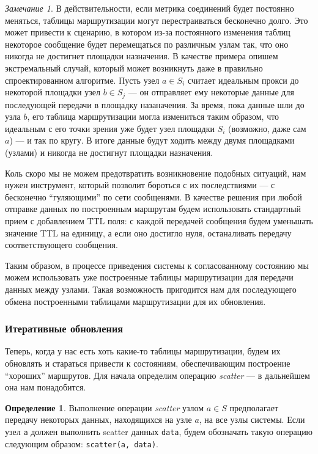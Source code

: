 \documentclass{article}
\theoremstyle{plain}
\theoremstyle{plain}
\theoremstyle{plain}
\theoremstyle{plain}
\theoremstyle{definition}
\newtheorem{definition}{Определение}[section]
\theoremstyle{remark}
\newtheorem{remark}{Замечание}[section]
\theoremstyle{plain}
\begin{document}
\begin{remark}
\label{InfinityLoops}
    В действительности, если метрика соединений будет постоянно меняться, таблицы маршрутизации могут перестраиваться бесконечно долго. Это может привести к сценарию, в котором из-за постоянного изменения таблиц некоторое сообщение будет перемещаться по различным узлам так, что оно никогда не достигнет площадки назначения. В качестве примера опишем экстремальный случай, который может возникнуть даже в правильно спроектированном алгоритме. Пусть узел $a \in S_i$ считает идеальным прокси до некоторой площадки узел $b \in S_j$ --- он отправляет ему некоторые данные для последующей передачи в площадку назаначения. За время, пока данные шли до узла $b$, его таблица маршрутизации могла измениться таким образом, что идеальным с его точки зрения уже будет узел площадки $S_i$ (возможно, даже сам $a$) --- и так по кругу. В итоге данные будут ходить между двумя площадками (узлами) и никогда не достигнут площадки назначения.
    
    Коль скоро мы не можем предотвратить возникновение подобных ситуаций, нам нужен инструмент, который позволит бороться с их последствиями --- с бесконечно \enquote{гуляющими} по сети сообщенями. В качестве решения при любой отправке данных по построенным маршрутам будем использовать стандартный \cite[с.~2]{RFC0791} прием с добавлением TTL поля: с каждой передачей сообщения будем уменьшать значение TTL на единицу, а если оно достигло нуля, останаливать передачу соответствующего сообщения.
\end{remark}

Таким образом, в процессе приведения системы к согласованному состоянию мы можем использовать уже построенные таблицы маршрутизации для передачи данных между узлами. Такая возможность пригодится нам для последующего обмена построенными таблицами маршрутизации для их обновления.

\subsubsection{Итеративные обновления}
\label{IterativeUpdates}

Теперь, когда у нас есть хоть какие-то таблицы маршрутизации, будем их обновлять и стараться привести к состояниям, обеспечивающим построение \enquote{хороших} маршрутов. Для начала определим операцию \textit{scatter} --- в дальнейшем она нам понадобится.

\begin{definition}
\label{ScatterDefinition}
    Выполнение операции \textit{scatter} узлом $a \in S$ предполагает передачу некоторых данных, находящихся на узле $a$, на все узлы системы. Если узел \texttt{a} должен выполнить scatter данных \texttt{data}, будем обозначать такую операцию следующим образом: \texttt{scatter(a, data)}.
\end{definition}
\end{document}
